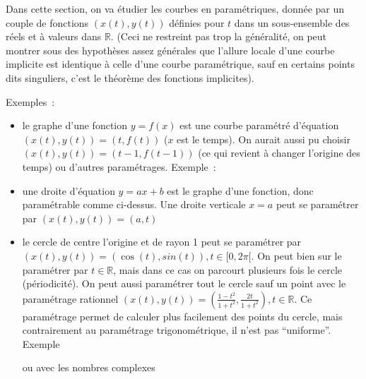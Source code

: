 \documentclass[a4paper,11pt]{book}
\begin{document}
\begin{giacjshere}
Dans cette section, on va \'etudier les courbes en param\'etriques,
donn\'ee par un couple de fonctions $(x(t),y(t))$ d\'efinies 
pour $t$ dans un sous-ensemble des r\'eels et \`a valeurs dans $\mathbb{R}$.
(Ceci ne restreint pas trop la g\'en\'eralit\'e,
on peut montrer sous des hypoth\`eses assez g\'en\'erales 
que l'allure locale d'une courbe implicite est identique \`a celle
d'une courbe param\'etrique, sauf en certains points dits singuliers,
c'est le th\'eor\`eme des fonctions implicites).

Exemples~:
\begin{itemize}
\item le graphe d'une fonction $y=f(x)$ est une courbe param\'etr\'e
d'\'equation $(x(t),y(t))=(t,f(t))$ ($x$ est le temps). 
On aurait aussi pu choisir
$(x(t),y(t))=(t-1,f(t-1))$ (ce qui revient \`a changer l'origine des
temps) ou d'autres param\'etrages.
Exemple~: \\
\item une droite d'\'equation $y=ax+b$ est le graphe d'une fonction,
donc param\'etrable comme ci-dessus. Une droite verticale $x=a$ peut
se param\'etrer par $(x(t),y(t))=(a,t)$
\item le cercle de centre l'origine et de rayon 1 peut se param\'etrer
  par $(x(t),y(t))=(\cos(t),sin(t)), t \in [0,2\pi[$. On peut bien sur
le param\'etrer par $t \in \mathbb{R}$, mais dans ce cas on parcourt plusieurs
fois le cercle (p\'eriodicit\'e). On peut aussi param\'etrer tout le
cercle sauf un point avec le param\'etrage rationnel
$(x(t),y(t))=(\frac{1-t^2}{1+t^2},\frac{2t}{1+t^2}), t \in \mathbb{R}$. Ce
param\'etrage permet de calculer plus facilement des points
du cercle, mais contrairement au param\'etrage trigonom\'etrique,
il n'est pas ``uniforme''.\\
Exemple 

ou avec les nombres complexes\\
\end{itemize}


\end{giacjshere}
\end{document}
